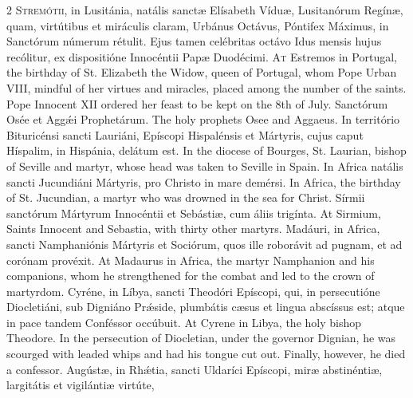 \begin{paracol}{2}
\lettrine[lines=2]{S}{tremótii,} in Lusitánia, 
 natális sanctæ Elísabeth Víduæ, Lusitanórum Regínæ, quam, virtútibus et 
 miráculis claram, Urbánus Octávus, Póntifex Máximus, in Sanctórum númerum 
 rétulit. Ejus tamen celébritas octávo Idus mensis hujus recólitur, ex 
 dispositióne Innocéntii Papæ Duodécimi.
\switchcolumn
{}
\lettrine[lines=2]{A}{t} Estremos in Portugal, the 
 birthday of St. Elizabeth the Widow, queen of Portugal, whom Pope Urban 
 VIII, mindful of her virtues and miracles, placed among the number of the 
 saints. Pope Innocent XII ordered her feast to be kept on the 8th of 
 July.
\switchcolumn*
{}
Sanctórum Osée et Aggǽi 
 Prophetárum.
\switchcolumn
{}
The holy prophets Osee and Aggaeus.
\switchcolumn*
{}
In território 
 Bituricénsi sancti Lauriáni, Epíscopi Hispalénsis et Mártyris, cujus caput 
 Híspalim, in Hispánia, delátum est.
\switchcolumn
{}
In the diocese of Bourges, St. 
 Laurian, bishop of Seville and martyr, whose head was taken to Seville in 
 Spain.
\switchcolumn*
{}
In Africa natális 
 sancti Jucundiáni Mártyris, pro Christo in mare demérsi.
\switchcolumn
{}
In Africa, the birthday of St. 
 Jucundian, a martyr who was drowned in the sea for Christ.
\switchcolumn*
{}
Sírmii sanctórum 
 Mártyrum Innocéntii et Sebástiæ, cum áliis trigínta.
\switchcolumn
{}
At Sirmium, Saints Innocent and 
 Sebastia, with thirty other martyrs.
\switchcolumn*
{}
Madáuri, in Africa, 
 sancti Namphaniónis Mártyris et Sociórum, quos ille roborávit ad pugnam, et 
 ad corónam provéxit.
\switchcolumn
{}
At Madaurus in Africa, the martyr 
 Namphanion and his companions, whom he strengthened for the combat and led 
 to the crown of martyrdom.
\switchcolumn*
{}
Cyréne, in Líbya, sancti Theodóri Epíscopi, qui, in persecutióne Diocletiáni, sub Digniáno 
 Prǽside, plumbátis cæsus et lingua abscíssus est; atque in pace tandem 
 Conféssor occúbuit.
\switchcolumn
{}
At Cyrene in Libya, the holy bishop 
 Theodore. In the persecution of Diocletian, under the governor Dignian, 
 he was scourged with leaded whips and had his tongue cut out. Finally, 
 however, he died a confessor.
\switchcolumn*
{}
Augústæ, in Rhǽtia, 
 sancti Uldaríci Epíscopi, miræ abstinéntiæ, largitátis et vigilántiæ virtúte, 

\end{paracol}
